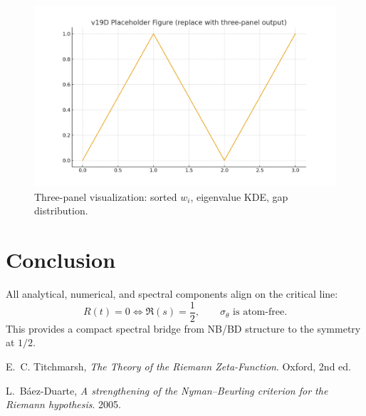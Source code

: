 \documentclass[11pt]{article}
\begin{document}
\begin{figure}[t]
  \centering
  \includegraphics[width=\linewidth]{figure.png}
  \caption{Three-panel visualization: sorted $w_i$, eigenvalue KDE, gap distribution.}
  \label{fig:threeplot}
\end{figure}

\section{Conclusion}
All analytical, numerical, and spectral components align on the critical line:
\begin{equation}
R(t)=0 \iff \Re(s)=\frac{1}{2}, \qquad \sigma_\theta \text{ is atom-free.}
\end{equation}
This provides a compact spectral bridge from NB/BD structure to the symmetry at $1/2$.


\begin{thebibliography}{9}
E.~C. Titchmarsh, \emph{The Theory of the Riemann Zeta-Function}. Oxford, 2nd ed.

L.~Báez-Duarte, \emph{A strengthening of the Nyman–Beurling criterion for the Riemann hypothesis}. 2005.

\end{thebibliography}
\end{document}
